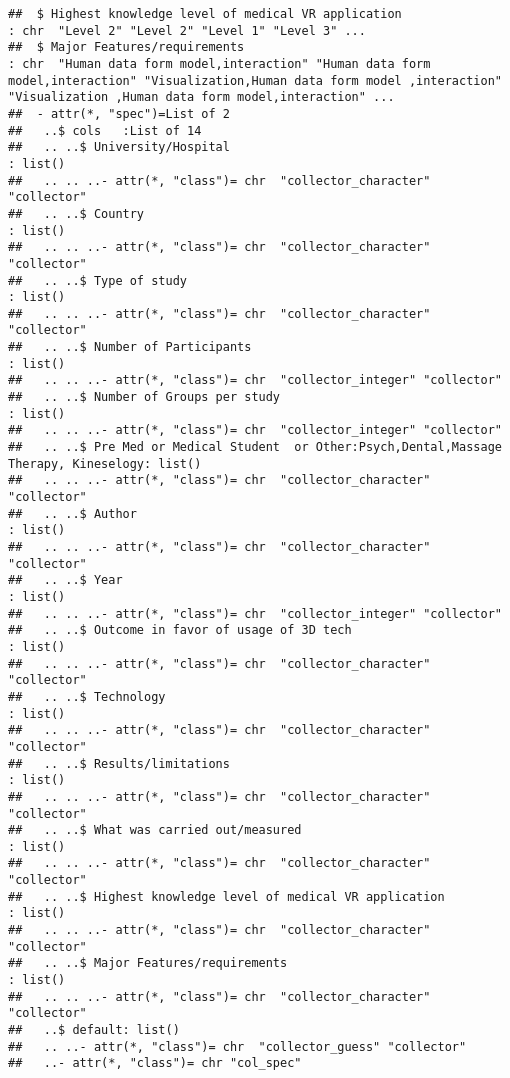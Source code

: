 \documentclass[]{article}
\begin{document}
\begin{verbatim}
##  $ Highest knowledge level of medical VR application                            : chr  "Level 2" "Level 2" "Level 1" "Level 3" ...
##  $ Major Features/requirements                                                  : chr  "Human data form model,interaction" "Human data form model,interaction" "Visualization,Human data form model ,interaction" "Visualization ,Human data form model,interaction" ...
##  - attr(*, "spec")=List of 2
##   ..$ cols   :List of 14
##   .. ..$ University/Hospital                                                          : list()
##   .. .. ..- attr(*, "class")= chr  "collector_character" "collector"
##   .. ..$ Country                                                                      : list()
##   .. .. ..- attr(*, "class")= chr  "collector_character" "collector"
##   .. ..$ Type of study                                                                : list()
##   .. .. ..- attr(*, "class")= chr  "collector_character" "collector"
##   .. ..$ Number of Participants                                                       : list()
##   .. .. ..- attr(*, "class")= chr  "collector_integer" "collector"
##   .. ..$ Number of Groups per study                                                   : list()
##   .. .. ..- attr(*, "class")= chr  "collector_integer" "collector"
##   .. ..$ Pre Med or Medical Student  or Other:Psych,Dental,Massage Therapy, Kineselogy: list()
##   .. .. ..- attr(*, "class")= chr  "collector_character" "collector"
##   .. ..$ Author                                                                       : list()
##   .. .. ..- attr(*, "class")= chr  "collector_character" "collector"
##   .. ..$ Year                                                                         : list()
##   .. .. ..- attr(*, "class")= chr  "collector_integer" "collector"
##   .. ..$ Outcome in favor of usage of 3D tech                                         : list()
##   .. .. ..- attr(*, "class")= chr  "collector_character" "collector"
##   .. ..$ Technology                                                                   : list()
##   .. .. ..- attr(*, "class")= chr  "collector_character" "collector"
##   .. ..$ Results/limitations                                                          : list()
##   .. .. ..- attr(*, "class")= chr  "collector_character" "collector"
##   .. ..$ What was carried out/measured                                                : list()
##   .. .. ..- attr(*, "class")= chr  "collector_character" "collector"
##   .. ..$ Highest knowledge level of medical VR application                            : list()
##   .. .. ..- attr(*, "class")= chr  "collector_character" "collector"
##   .. ..$ Major Features/requirements                                                  : list()
##   .. .. ..- attr(*, "class")= chr  "collector_character" "collector"
##   ..$ default: list()
##   .. ..- attr(*, "class")= chr  "collector_guess" "collector"
##   ..- attr(*, "class")= chr "col_spec"
\end{verbatim}
\end{document}
